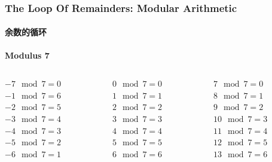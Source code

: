 \documentclass[
	11pt, %
	handout,
]{beamer}
\begin{document}
\begin{frame}
	\frametitle{The Loop Of Remainders: Modular Arithmetic}
	\framesubtitle{余数的循环}
	\textbf{Modulus 7}

		\begin{columns}[t] %
		\begin{column}{0.3\textwidth} %
		$-7 \mod 7 = 0$ \\
		$-1 \mod 7 = 6$ \\
		$-2 \mod 7 = 5$ \\
		$-3 \mod 7 = 4$ \\
		$-4 \mod 7 = 3$ \\
		$-5 \mod 7 = 2$ \\
		$-6 \mod 7 = 1$ \\
		\end{column}
		\begin{column}{0.3\textwidth} %
		$0 \mod 7 = 0$ \\
		$1 \mod 7 = 1$ \\
		$2 \mod 7 = 2$ \\
		$3 \mod 7 = 3$ \\
		$4 \mod 7 = 4$ \\
		$5 \mod 7 = 5$ \\
		$6 \mod 7 = 6$ \\
		\end{column}

		\begin{column}{0.3\textwidth} %
		$7 \mod 7 = 0$ \\
		$8 \mod 7 = 1$ \\
		$9 \mod 7 = 2$ \\
		$10 \mod 7 = 3$ \\
		$11 \mod 7 = 4$ \\
		$12 \mod 7 = 5$ \\
		$13 \mod 7 = 6$ \\
		\end{column}
	\end{columns}
\end{frame}

\end{document}
